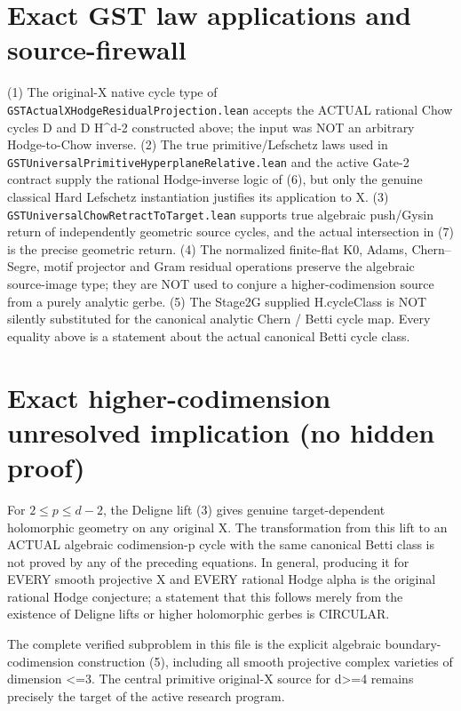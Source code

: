 \documentclass[11pt]{article}
\begin{document}
\section{Exact GST law applications and source-firewall}
(1) The original-X native cycle type of
\texttt{GSTActualXHodgeResidualProjection.lean}
accepts the ACTUAL rational Chow cycles D and
D H^{d-2} constructed above; the input was
NOT an arbitrary Hodge-to-Chow inverse.
(2) The true primitive/Lefschetz laws used in
\texttt{GSTUniversalPrimitiveHyperplaneRelative.lean}
and the active Gate-2 contract supply the
rational Hodge-inverse logic of (6), but
only the genuine classical Hard Lefschetz
instantiation justifies its application to X.
(3) \texttt{GSTUniversalChowRetractToTarget.lean}
supports true algebraic push/Gysin return of
independently geometric source cycles, and
the actual intersection in (7) is the
precise geometric return.
(4) The normalized finite-flat K0,
Adams, Chern--Segre, motif projector and
Gram residual operations preserve the
algebraic source-image type; they are NOT
used to conjure a higher-codimension
source from a purely analytic gerbe.
(5) The Stage2G supplied H.cycleClass
is NOT silently substituted for the
canonical analytic Chern / Betti cycle map.
Every equality above is a statement about
the actual canonical Betti cycle class.

\section{Exact higher-codimension unresolved implication (no hidden proof)}
For \(2\le p\le d-2\), the Deligne lift (3)
gives genuine target-dependent holomorphic
geometry on any original X. The transformation
from this lift to an ACTUAL algebraic codimension-p
cycle with the same canonical Betti class
is not proved by any of the preceding equations.
In general, producing it for EVERY smooth
projective X and EVERY rational Hodge alpha
is the original rational Hodge conjecture;
a statement that this follows merely from
the existence of Deligne lifts or higher
holomorphic gerbes is CIRCULAR.

The complete verified subproblem in this file
is the explicit algebraic boundary-codimension
construction (5), including all smooth projective
complex varieties of dimension <=3.
The central primitive original-X source
for d>=4 remains precisely the target
of the active research program.
\end{document}
